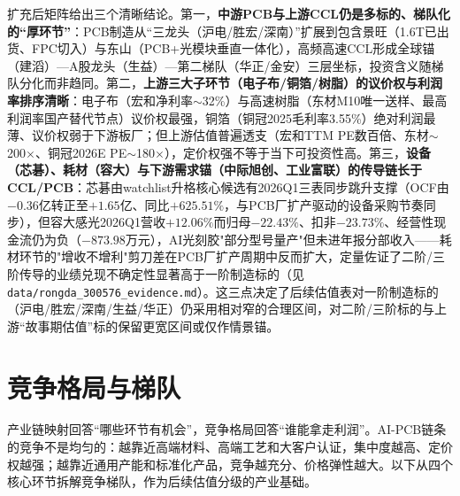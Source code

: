 扩充后矩阵给出三个清晰结论。第一，\textbf{中游PCB与上游CCL仍是多标的、梯队化的“厚环节”}：PCB制造从“三龙头（沪电/胜宏/深南）”扩展到包含景旺（1.6T已出货、FPC切入）与东山（PCB+光模块垂直一体化），高频高速CCL形成全球锚（建滔）—A股龙头（生益）—第二梯队（华正/金安）三层坐标，投资含义随梯队分化而非趋同。第二，\textbf{上游三大子环节（电子布/铜箔/树脂）的议价权与利润率排序清晰}：电子布（宏和净利率$\sim$32\%）与高速树脂（东材M10唯一送样、最高利润率国产替代节点）议价权最强，铜箔（铜冠2025毛利率3.55\%）绝对利润最薄、议价权弱于下游板厂；但上游估值普遍透支（宏和TTM PE数百倍、东材$\sim$200$\times$、铜冠2026E PE$\sim$180$\times$），定价权强不等于当下可投资性高。第三，\textbf{设备（芯碁）、耗材（容大）与下游需求锚（中际旭创、工业富联）的传导链长于CCL/PCB}：芯碁由watchlist升格核心候选有2026Q1三表同步跳升支撑（OCF由$-0.36$亿转正至$+1.65$亿、同比$+625.51\%$，与PCB厂扩产驱动的设备采购节奏同步），但容大感光2026Q1营收$+12.06\%$而归母$-22.43\%$、扣非$-23.73\%$、经营性现金流仍为负（$-873.98$万元），AI光刻胶"部分型号量产"但未进年报分部收入——耗材环节的"增收不增利"剪刀差在PCB厂扩产周期中反而扩大，定量佐证了二阶/三阶传导的业绩兑现不确定性显著高于一阶制造标的（见\texttt{data/rongda\_300576\_evidence.md}）。这三点决定了后续估值表对一阶制造标的（沪电/胜宏/深南/生益/华正）仍采用相对窄的合理区间，对二阶/三阶标的与上游“故事期估值”标的保留更宽区间或仅作情景锚。

\section{竞争格局与梯队}

产业链映射回答“哪些环节有机会”，竞争格局回答“谁能拿走利润”。AI-PCB链条的竞争不是均匀的：越靠近高端材料、高端工艺和大客户认证，集中度越高、定价权越强；越靠近通用产能和标准化产品，竞争越充分、价格弹性越大。以下从四个核心环节拆解竞争梯队，作为后续估值分级的产业基础。

